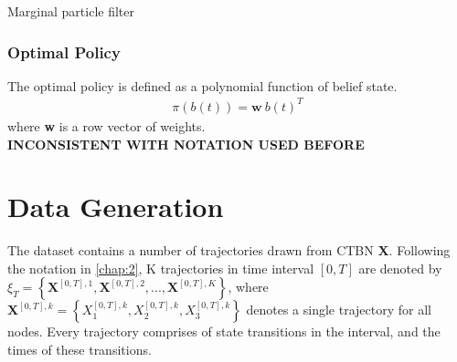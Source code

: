 \begin{algorithm}[H]
	
	\vspace{+4pt}
	\begin{algorithmic}[1]
		\ENDFOR
		 
		\ENDFOR
	\end{algorithmic}
	\caption{Marginal particle filter}
\end{algorithm}

\subsubsection{Optimal Policy}

The optimal policy is defined as a polynomial function of belief state.
\begin{align}
\pi(b(t)) = \textbf{w}\ b(t)^T
\end{align}
where \textbf{w} is a row vector of weights.\\
\textbf{INCONSISTENT WITH NOTATION USED BEFORE}

\section{Data Generation}
The dataset contains a number of trajectories drawn from CTBN \textbf{X}. Following the notation in \autoref{chap:2}, K trajectories in time interval $ [0, T] $ are denoted by $ \xi_T = \left\lbrace \textbf{X}^{[0,T], 1}, \textbf{X}^{[0,T], 2}, ..., \textbf{X}^{[0,T], K} \right\rbrace  $, where $ \textbf{X}^{[0,T],k} = \left\lbrace X_1^{[0,T],k} , X_2^{[0,T],k}, X_3^{[0,T],k}\right\rbrace $ denotes a single trajectory for all nodes. Every trajectory comprises of state transitions in the interval, and the times of these transitions. 

